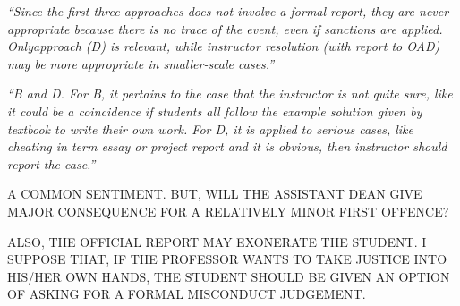 \documentclass[12pt]{beamer}
\newcommand\ans[1]{{\it ``#1''}}
\newcommand\gap{\vspace{5mm}}
\begin{document}
\begin{frame}


  \ans{Since  the  first  three  approaches  does  not  involve  a  formal  report,  they  are  never appropriate because there is no trace of the event, even if sanctions are applied.  Onlyapproach  (D)  is  relevant,  while  instructor  resolution  (with  report  to  OAD)  may  be more appropriate in smaller-scale cases.}


  \ans{B and D. For B, it pertains to the case that the instructor is not quite sure, like it could be a coincidence if students all follow the example solution given by textbook to write their own work. For D, it is applied to serious cases, like cheating in term essay or project report and it is obvious, then instructor should report the case.}
  

\gap

A COMMON SENTIMENT. BUT, WILL THE ASSISTANT DEAN GIVE MAJOR CONSEQUENCE FOR A RELATIVELY MINOR FIRST OFFENCE? 

\gap

ALSO, THE OFFICIAL REPORT MAY EXONERATE THE STUDENT. I SUPPOSE THAT, IF THE PROFESSOR WANTS TO TAKE JUSTICE INTO HIS/HER OWN HANDS, THE STUDENT SHOULD BE GIVEN AN OPTION OF ASKING FOR A FORMAL MISCONDUCT JUDGEMENT.

\end{frame}

\begin{frame}


\end{frame}
\end{document}

